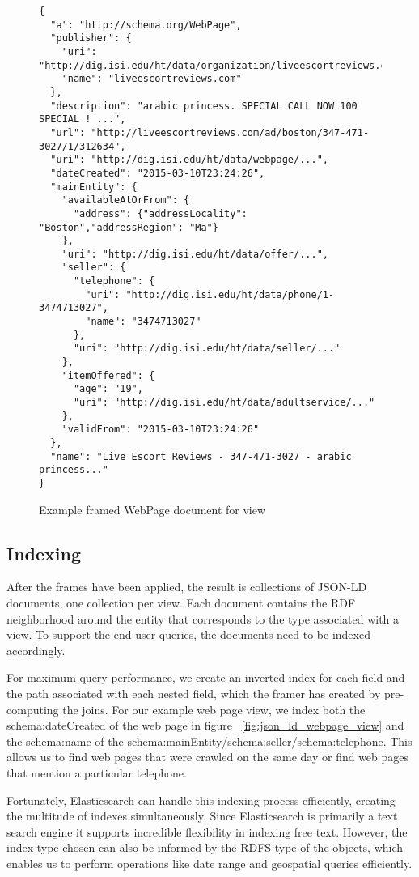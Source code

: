 \begin{figure}
\vspace{-0.2cm}
\begin{verbatim}
{
  "a": "http://schema.org/WebPage",
  "publisher": {
    "uri": "http://dig.isi.edu/ht/data/organization/liveescortreviews.com",
    "name": "liveescortreviews.com"
  },
  "description": "arabic princess. SPECIAL CALL NOW 100 SPECIAL ! ...",
  "url": "http://liveescortreviews.com/ad/boston/347-471-3027/1/312634",
  "uri": "http://dig.isi.edu/ht/data/webpage/...",
  "dateCreated": "2015-03-10T23:24:26",
  "mainEntity": {
    "availableAtOrFrom": {
      "address": {"addressLocality": "Boston","addressRegion": "Ma"}
    },
    "uri": "http://dig.isi.edu/ht/data/offer/...",
    "seller": {
      "telephone": {
        "uri": "http://dig.isi.edu/ht/data/phone/1-3474713027",
        "name": "3474713027"
      },
      "uri": "http://dig.isi.edu/ht/data/seller/..."
    },
    "itemOffered": {
      "age": "19",
      "uri": "http://dig.isi.edu/ht/data/adultservice/..."
    },
    "validFrom": "2015-03-10T23:24:26"
  },
  "name": "Live Escort Reviews - 347-471-3027 - arabic princess..."
}
\end{verbatim}
\vspace{-0.2cm}
\caption{Example framed WebPage document for view}
\label{fig:framed-webpage}
\end{figure}
\subsection{Indexing}
After the frames have been applied, the result is collections of JSON-LD documents, one collection per view.  
Each document contains the RDF neighborhood around the entity that corresponds to the type associated with a view.  
To support the end user queries, the documents need to be indexed accordingly.  

For maximum query performance, we create an inverted index for each field and the path associated with each nested field, which the framer has created by pre-computing the joins.  
For our example web page view,  we index both the schema:dateCreated of the web page in figure ~\ref{fig:json_ld_webpage_view} and the schema:name of the schema:mainEntity/schema:seller/schema:telephone.  
This allows us to find web pages that were crawled on the same day or find web pages that mention a particular telephone.  

Fortunately, Elasticsearch can handle this indexing process efficiently, creating the multitude of indexes simultaneously.  
Since Elasticsearch is primarily a text search engine it supports incredible flexibility in indexing free text.  
However, the index type chosen can also be informed by the RDFS type of the objects, which enables us to perform operations like date range and geospatial queries efficiently.

